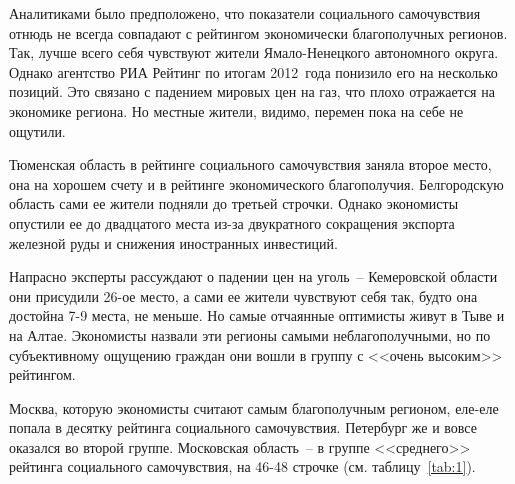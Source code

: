   Аналитиками было предположено, что показатели социального самочувствия отнюдь
  не всегда совпадают с рейтингом экономически благополучных регионов. Так,
  лучше всего себя чувствуют жители Ямало-Ненецкого автономного округа. Однако
  агентство РИА Рейтинг по итогам 2012~года понизило его на несколько позиций.
  Это связано с падением мировых цен на газ, что плохо отражается на экономике
  региона. Но местные жители, видимо, перемен пока на себе не ощутили.

  Тюменская область в рейтинге социального самочувствия заняла второе место,
  она на хорошем счету и в рейтинге экономического благополучия. Белгородскую
  область сами ее жители подняли до третьей строчки. Однако экономисты опустили
  ее до двадцатого места из-за двукратного сокращения экспорта железной руды и
  снижения иностранных инвестиций.

  Напрасно эксперты рассуждают о падении цен на уголь~-- Кемеровской области
  они присудили 26-ое место, а сами ее жители чувствуют себя так, будто она
  достойна 7-9 места, не меньше. Но самые отчаянные оптимисты живут в Тыве и на
  Алтае. Экономисты назвали эти регионы самыми неблагополучными, но по
  субъективному ощущению граждан они вошли в группу с <<очень высоким>>
  рейтингом.

  Москва, которую экономисты считают самым благополучным регионом, еле-еле
  попала в десятку рейтинга социального самочувствия. Петербург же и вовсе
  оказался во второй группе. Московская область~-- в группе <<среднего>>
  рейтинга социального самочувствия, на 46-48 строчке
  (см. таблицу~\ref{tab:1}).~\cite{rbk}

